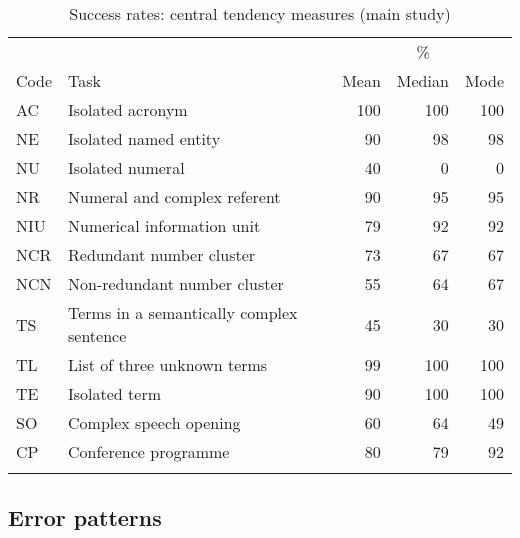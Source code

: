 \begin{table}
\begin{tabular}{ll rrr}
\lsptoprule
              &                                       & \multicolumn{3}{c}{\%}\\\cmidrule(lr){3-5}
Code          & Task                                  & {Mean} & {Median} & {Mode} \\ \midrule
AC            & Isolated acronym                      & 100         & 100           & 100         \\
NE            & Isolated named entity                 & 90          & 98            & 98          \\
NU            & Isolated numeral                      & 40          & 0             & 0           \\
NR            & Numeral and complex referent                  & 90          & 95            & 95          \\
NIU           & Numerical  information unit           & 79          & 92            & 92          \\
NCR           & Redundant number cluster              & 73          & 67            & 67          \\
NCN           & Non-redundant number cluster          & 55          & 64            & 67          \\
TS            & Terms in a semantically complex sentence & 45          & 30            & 30          \\
TL            & List of three unknown terms           & 99          & 100           & 100         \\
TE            & Isolated term                         & 90          & 100           & 100         \\
SO            & Complex speech opening                & 60          & 64            & 49          \\
CP            & Conference programme                  & 80          & 79            & 92          \\\lspbottomrule
\end{tabular}
\caption{Success rates: central tendency measures (main study)}
\label{tab:22}
\end{table}




\subsection{Error patterns}

